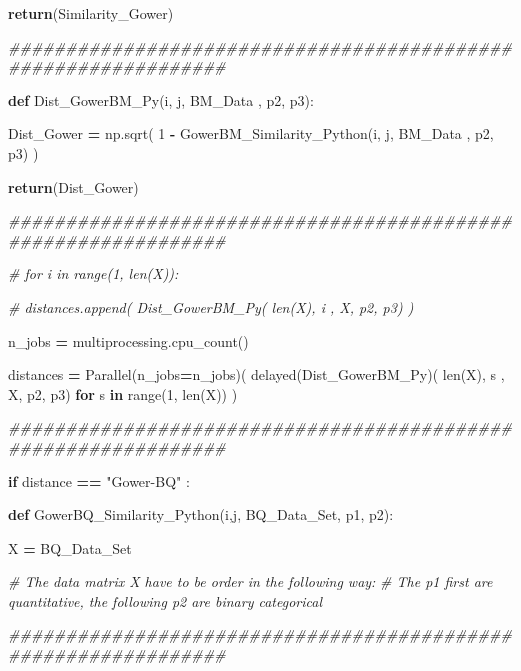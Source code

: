 \documentclass[
  11pt,
  a4paper,
]{article}
\newenvironment{Shaded}{\begin{snugshade}}{\end{snugshade}}
\newcommand{\BuiltInTok}[1]{#1}
\newcommand{\CommentTok}[1]{\textcolor[rgb]{0.56,0.35,0.01}{\textit{#1}}}
\newcommand{\ControlFlowTok}[1]{\textcolor[rgb]{0.13,0.29,0.53}{\textbf{#1}}}
\newcommand{\DecValTok}[1]{\textcolor[rgb]{0.00,0.00,0.81}{#1}}
\newcommand{\KeywordTok}[1]{\textcolor[rgb]{0.13,0.29,0.53}{\textbf{#1}}}
\newcommand{\NormalTok}[1]{#1}
\newcommand{\OperatorTok}[1]{\textcolor[rgb]{0.81,0.36,0.00}{\textbf{#1}}}
\newcommand{\StringTok}[1]{\textcolor[rgb]{0.31,0.60,0.02}{#1}}
\begin{document}
\begin{Shaded}
\begin{Highlighting}[]
            \ControlFlowTok{return}\NormalTok{(Similarity\_Gower)}

\CommentTok{\#\#\#\#\#\#\#\#\#\#\#\#\#\#\#\#\#\#\#\#\#\#\#\#\#\#\#\#\#\#\#\#\#\#\#\#\#\#\#\#\#\#\#\#\#\#\#\#\#\#\#\#\#\#\#\#\#\#\#\#\#\#\#}
        
        \KeywordTok{def}\NormalTok{ Dist\_GowerBM\_Py(i, j, BM\_Data ,  p2, p3):}

\NormalTok{            Dist\_Gower }\OperatorTok{=}\NormalTok{ np.sqrt( }\DecValTok{1} \OperatorTok{{-}}\NormalTok{ GowerBM\_Similarity\_Python(i, j, BM\_Data , p2, p3) )}

            \ControlFlowTok{return}\NormalTok{(Dist\_Gower)}

\CommentTok{\#\#\#\#\#\#\#\#\#\#\#\#\#\#\#\#\#\#\#\#\#\#\#\#\#\#\#\#\#\#\#\#\#\#\#\#\#\#\#\#\#\#\#\#\#\#\#\#\#\#\#\#\#\#\#\#\#\#\#\#\#\#\#}

        \CommentTok{\# for i in range(1, len(X)):}

            \CommentTok{\# distances.append( Dist\_GowerBM\_Py( len(X), i , X, p2, p3) )}

\NormalTok{        n\_jobs  }\OperatorTok{=}\NormalTok{ multiprocessing.cpu\_count()}

\NormalTok{        distances }\OperatorTok{=}\NormalTok{ Parallel(n\_jobs}\OperatorTok{=}\NormalTok{n\_jobs)( delayed(Dist\_GowerBM\_Py)( }\BuiltInTok{len}\NormalTok{(X), s , X, p2, p3) }\ControlFlowTok{for}\NormalTok{ s }\KeywordTok{in} \BuiltInTok{range}\NormalTok{(}\DecValTok{1}\NormalTok{, }\BuiltInTok{len}\NormalTok{(X)) )}

\CommentTok{\#\#\#\#\#\#\#\#\#\#\#\#\#\#\#\#\#\#\#\#\#\#\#\#\#\#\#\#\#\#\#\#\#\#\#\#\#\#\#\#\#\#\#\#\#\#\#\#\#\#\#\#\#\#\#\#\#\#\#\#\#\#\#}
    
    \ControlFlowTok{if}\NormalTok{ distance }\OperatorTok{==} \StringTok{"Gower{-}BQ"}\NormalTok{ :}

        \KeywordTok{def}\NormalTok{ GowerBQ\_Similarity\_Python(i,j, BQ\_Data\_Set, p1, p2):}

\NormalTok{            X }\OperatorTok{=}\NormalTok{ BQ\_Data\_Set}


        \CommentTok{\# The data matrix X have to be order in the following way:}
        \CommentTok{\# The p1 first are quantitative, the following p2 are binary categorical }

\CommentTok{\#\#\#\#\#\#\#\#\#\#\#\#\#\#\#\#\#\#\#\#\#\#\#\#\#\#\#\#\#\#\#\#\#\#\#\#\#\#\#\#\#\#\#\#\#\#\#\#\#\#\#\#\#\#\#\#\#\#\#\#\#\#\#}
        

\end{Highlighting}
\end{Shaded}
\end{document}
